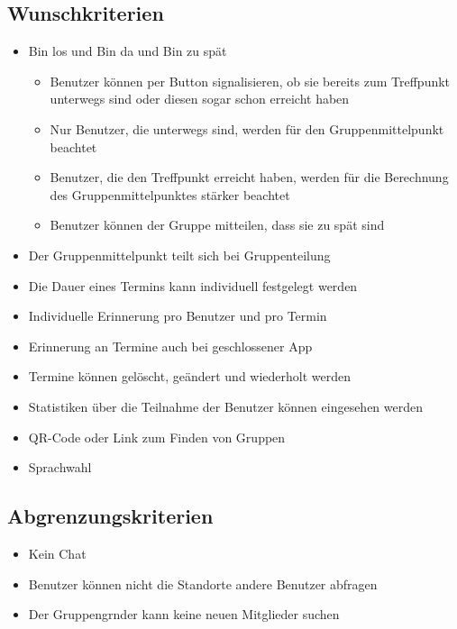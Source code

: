 \documentclass{scrartcl}
\begin{document}
	\subsection{Wunschkriterien}
	\begin{itemize}
		\item \glqq{}Bin los\grqq{} und \glqq{}Bin da\grqq{} und \glqq{}Bin zu spät\grqq{}
		\begin{itemize}
			\item Benutzer können per Button signalisieren, ob sie bereits zum Treffpunkt unterwegs sind oder diesen sogar schon erreicht haben
			\item Nur Benutzer, die unterwegs sind, werden für den Gruppenmittelpunkt beachtet
			\item Benutzer, die den Treffpunkt erreicht haben, werden für die Berechnung des Gruppenmittelpunktes stärker beachtet
			\item Benutzer können der Gruppe mitteilen, dass sie zu spät sind
		\end{itemize}
		\item Der Gruppenmittelpunkt teilt sich bei Gruppenteilung
		\item Die Dauer eines Termins kann individuell festgelegt werden
		\item Individuelle Erinnerung pro Benutzer und pro Termin
		\item Erinnerung an Termine auch bei geschlossener App
		\item Termine können gelöscht, geändert und wiederholt werden
		\item Statistiken über die Teilnahme der Benutzer können eingesehen werden
		\item QR-Code oder Link zum Finden von Gruppen
		\item Sprachwahl
	\end{itemize}
	\subsection{Abgrenzungskriterien}
	\begin{itemize}
		\item Kein Chat
		\item Benutzer können nicht die Standorte andere Benutzer abfragen
		\item Der \gls{Gruppengrnder} kann keine neuen Mitglieder suchen
	\end{itemize}

	\newpage
	
	
	
\end{document}

